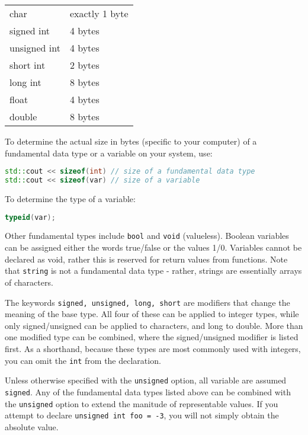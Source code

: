 \documentclass[10pt]{article}
\begin{document}
\begin{center}
\begin{tabular} {l l}
char & exactly 1 byte \\
signed int & 4 bytes\\
unsigned int & 4 bytes\\
short int & 2 bytes\\
long int & 8 bytes\\
float & 4 bytes\\
double & 8 bytes\\
\end{tabular}
\end{center}

To determine the actual size in bytes (specific to your computer) of a fundamental data type or a variable on your system, use:

\begin{lstlisting}[language=C++]
std::cout << sizeof(int) // size of a fundamental data type
std::cout << sizeof(var) // size of a variable
\end{lstlisting}

To determine the type of a variable:

\begin{lstlisting}[language=C++]
typeid(var);
\end{lstlisting}

Other fundamental types include \texttt{bool} and \texttt{void} (valueless). Boolean variables can be assigned either the words true/false or the values 1/0. Variables cannot be declared as void, rather this is reserved for return values from functions. Note that \texttt{string} is not a fundamental data type - rather, strings are essentially arrays of characters.

The keywords \texttt{signed, unsigned, long, short} are modifiers that change the meaning of the base type. All four of these can be applied to integer types, while only signed/unsigned can be applied to characters, and long to double. More than one modified type can be combined, where the signed/unsigned modifier is listed first. As a shorthand, because these types are most commonly used with integers, you can omit the \texttt{int} from the declaration.

Unless otherwise specified with the \texttt{unsigned} option, all variable are assumed \texttt{signed}. Any of the fundamental data types listed above can be combined with the \texttt{unsigned} option to extend the manitude of representable values. If you attempt to declare \texttt{unsigned int foo = -3}, you will not simply obtain the absolute value.
\end{document}
